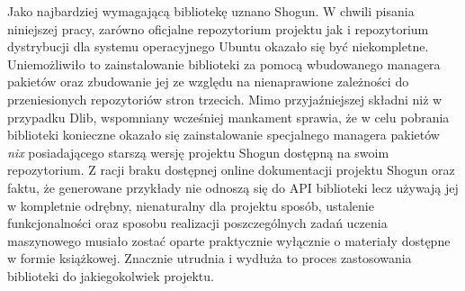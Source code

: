Jako najbardziej wymagającą bibliotekę uznano Shogun. W chwili pisania niniejszej pracy, zarówno oficjalne repozytorium projektu jak i repozytorium dystrybucji dla systemu operacyjnego Ubuntu okazało się być niekompletne. Uniemożliwiło to zainstalowanie biblioteki za pomocą wbudowanego managera pakietów oraz zbudowanie jej ze względu na nienaprawione zależności do przeniesionych repozytoriów stron trzecich. Mimo przyjaźniejszej składni niż w przypadku Dlib, wspomniany wcześniej mankament sprawia, że w celu pobrania biblioteki konieczne okazało się zainstalowanie specjalnego managera pakietów \textit{nix} posiadającego starszą wersję projektu Shogun dostępną na swoim repozytorium. Z racji braku dostępnej online dokumentacji projektu Shogun oraz faktu, że generowane przykłady nie odnoszą się do API biblioteki lecz używają jej w kompletnie odrębny, nienaturalny dla projektu sposób, ustalenie funkcjonalności oraz sposobu realizacji poszczególnych zadań uczenia maszynowego musiało zostać oparte praktycznie wyłącznie o materiały dostępne w formie książkowej. Znacznie utrudnia i wydłuża to proces zastosowania biblioteki do jakiegokolwiek projektu.